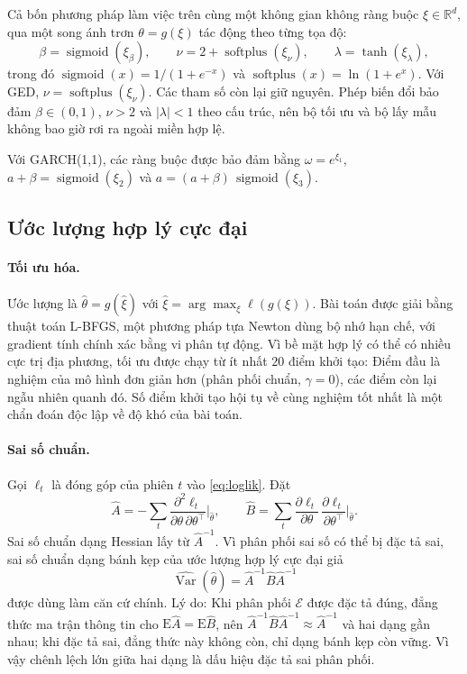 \documentclass[12pt,a4paper]{article}
\theoremstyle{definition}
\theoremstyle{remark}
\newcommand{\E}{\mathrm{E}}
\newcommand{\Var}{\operatorname{Var}}
\newcommand{\Ecal}{\mathcal{E}}
\newcommand{\sigm}{\operatorname{sigmoid}}
\newcommand{\splus}{\operatorname{softplus}}
\begin{document}
Cả bốn phương pháp làm việc trên cùng một không gian không ràng buộc $\xi\in\mathbb R^{d}$, qua một song ánh trơn $\theta=g(\xi)$ tác động theo từng tọa độ:
\begin{equation}\label{eq:reparam}
\beta=\sigm(\xi_\beta),\qquad \nu=2+\splus(\xi_\nu),\qquad \lambda=\tanh(\xi_\lambda),
\end{equation}
trong đó $\sigm(x)=1/(1+e^{-x})$ và $\splus(x)=\ln(1+e^{x})$. Với GED, $\nu=\splus(\xi_\nu)$. Các tham số còn lại giữ nguyên. Phép biến đổi bảo đảm $\beta\in(0,1)$, $\nu>2$ và $|\lambda|<1$ theo cấu trúc, nên bộ tối ưu và bộ lấy mẫu không bao giờ rơi ra ngoài miền hợp lệ.

Với GARCH(1,1), các ràng buộc được bảo đảm bằng $\omega=e^{\xi_1}$, $a+\beta=\sigm(\xi_2)$ và $a=(a+\beta)\,\sigm(\xi_3)$.

\subsection{Ước lượng hợp lý cực đại}

\paragraph{Tối ưu hóa.} Ước lượng là $\hat\theta=g(\hat\xi)$ với $\hat\xi=\arg\max_{\xi}\ell(g(\xi))$. Bài toán được giải bằng thuật toán L-BFGS, một phương pháp tựa Newton dùng bộ nhớ hạn chế, với gradient tính chính xác bằng vi phân tự động. Vì bề mặt hợp lý có thể có nhiều cực trị địa phương, tối ưu được chạy từ ít nhất $20$ điểm khởi tạo: Điểm đầu là nghiệm của mô hình đơn giản hơn (phân phối chuẩn, $\gamma=0$), các điểm còn lại ngẫu nhiên quanh đó. Số điểm khởi tạo hội tụ về cùng nghiệm tốt nhất là một chẩn đoán độc lập về độ khó của bài toán.

\paragraph{Sai số chuẩn.} Gọi $\ell_t$ là đóng góp của phiên $t$ vào \eqref{eq:loglik}. Đặt
\begin{equation}
\hat A=-\sum_t\frac{\partial^2\ell_t}{\partial\theta\,\partial\theta^\top}\Big|_{\hat\theta},\qquad
\hat B=\sum_t\frac{\partial\ell_t}{\partial\theta}\,\frac{\partial\ell_t}{\partial\theta^\top}\Big|_{\hat\theta}.
\end{equation}
Sai số chuẩn dạng Hessian lấy từ $\hat A^{-1}$. Vì phân phối sai số có thể bị đặc tả sai, sai số chuẩn dạng bánh kẹp của ước lượng hợp lý cực đại giả \cite{bollerslevwooldridge1992}
\begin{equation}
\widehat{\Var}(\hat\theta)=\hat A^{-1}\hat B\hat A^{-1}
\end{equation}
được dùng làm căn cứ chính. Lý do: Khi phân phối $\Ecal$ được đặc tả đúng, đẳng thức ma trận thông tin cho $\E\hat A=\E\hat B$, nên $\hat A^{-1}\hat B\hat A^{-1}\approx\hat A^{-1}$ và hai dạng gần nhau; khi đặc tả sai, đẳng thức này không còn, chỉ dạng bánh kẹp còn vững. Vì vậy chênh lệch lớn giữa hai dạng là dấu hiệu đặc tả sai phân phối.
\end{document}
